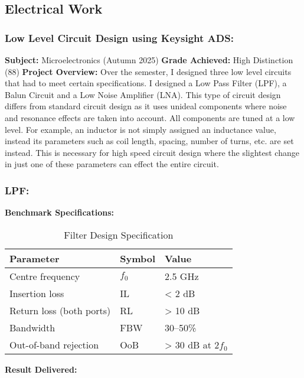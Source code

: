 \subsection{Electrical Work}

\subsubsection{Low Level Circuit Design using Keysight ADS:}
\textbf{Subject: } Microelectronics (Autumn 2025) \newline
\textbf{Grade Achieved: } High Distinction (88) \newline
\textbf{Project Overview: }
Over the semester, I designed three low level circuits that had to meet certain specifications. I designed a Low Pass Filter (LPF), a Balun Circuit and a Low Noise Amplifier (LNA).
This type of circuit design differs from standard circuit design as it uses unideal components where noise and resonance effects are taken into account. All components are tuned at
a low level. For example, an inductor is not simply assigned an inductance value, instead its parameters such as coil length, spacing, number of turns, etc. are set instead. This is necessary 
for high speed circuit design where the slightest change in just one of these parameters can effect the entire circuit. 

\subsubsection{LPF:}

\textbf{Benchmark Specifications: }

\begin{table}[htbp]
\centering
\begin{tabularx}{\textwidth}{@{} l l X @{}}
\toprule
\textbf{Parameter} & \textbf{Symbol} & \textbf{Value} \\
\midrule
Centre frequency & $f_0$ & 2.5 GHz \\
Insertion loss & IL & < 2 dB \\
Return loss (both ports) & RL & > 10 dB \\
Bandwidth & FBW & 30–50\% \\
Out-of-band rejection & OoB & > 30 dB at $2f_0$ \\
\bottomrule
\end{tabularx}
\caption{Filter Design Specification}
\end{table}

\newpage
\textbf{Result Delivered: }

